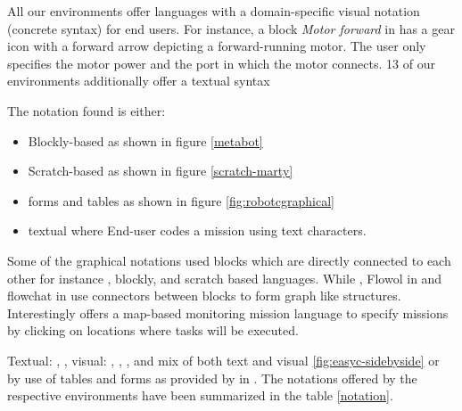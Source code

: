  All our environments offer languages with a domain-specific visual notation (concrete syntax) for end users. For instance, a block \emph{Motor forward} in \trik has a gear icon with a forward arrow depicting a forward-running motor. The user only specifies the motor power and the port in which the motor connects. 13 of our environments additionally offer a textual syntax

The notation found is either:%
\begin{itemize}
	\item Blockly-based as shown in figure \ref{metabot}%
	\item Scratch-based as shown in figure
	\ref{scratch-marty}%
	\item forms and tables as shown in figure \ref{fig:robotcgraphical}%
	\item textual where End-user codes a mission using text characters.%
\end{itemize}

Some of the graphical notations used blocks which are directly connected to each other for instance \trik, blockly, and scratch based languages. While \choregraphe, Flowol in \robotmesh and flowchat in \picaxe use connectors between blocks to form graph like structures. %
Interestingly \flyaq offers a map-based 
monitoring mission language to specify missions by clicking on locations where tasks will be executed. 

Textual: \edison, \choregraphe, 
visual: \minibloq, \trik, \choregraphe, and mix of both text and visual \easyc \ref{fig:easyc-sidebyside} or by use of tables and forms as provided by \robotc in  %
. %
The notations offered by the respective environments have been summarized in the table \ref{notation}.

